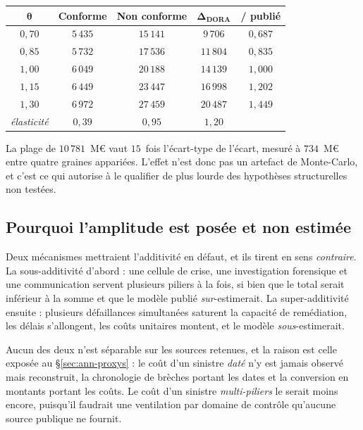 \begin{center}\footnotesize
\renewcommand{\arraystretch}{1.25}
\begin{tabular}{@{}c c c c c@{}}
\toprule
$\boldsymbol{\theta}$ & \textbf{Conforme} & \textbf{Non conforme} &
$\boldsymbol{\Delta_{\text{DORA}}}$ & \textbf{/ publié} \\
\midrule
$0{,}70$ & $5\,435$ & $15\,141$ & $9\,706$ & $0{,}687$ \\
$0{,}85$ & $5\,732$ & $17\,536$ & $11\,804$ & $0{,}835$ \\
$1{,}00$ & $6\,049$ & $20\,188$ & $14\,139$ & $1{,}000$ \\
$1{,}15$ & $6\,449$ & $23\,447$ & $16\,998$ & $1{,}202$ \\
$1{,}30$ & $6\,972$ & $27\,459$ & $20\,487$ & $1{,}449$ \\
\midrule
\emph{élasticité} & $0{,}39$ & $0{,}95$ & $1{,}20$ & \\
\bottomrule
\end{tabular}
\end{center}

\vspace{4pt}
\noindent La plage de $10\,781$~M\euro{} vaut $15$~fois l'écart-type de l'écart, mesuré à
$734$~M\euro{} entre quatre graines appariées. L'effet n'est donc pas un artefact de Monte-Carlo,
et c'est ce qui autorise à le qualifier de plus lourde des hypothèses structurelles non testées.

\subsection*{Pourquoi l'amplitude est posée et non estimée}

Deux mécanismes mettraient l'additivité en défaut, et ils tirent en sens \emph{contraire}. La
sous-additivité d'abord : une cellule de crise, une investigation forensique et une communication
servent plusieurs piliers à la fois, si bien que le total serait inférieur à la somme et que le
modèle publié \emph{sur}-estimerait. La super-additivité ensuite : plusieurs défaillances
simultanées saturent la capacité de remédiation, les délais s'allongent, les coûts unitaires
montent, et le modèle \emph{sous}-estimerait.

Aucun des deux n'est séparable sur les sources retenues, et la raison est celle exposée au
\S\ref{sec:ann-proxys} : le coût d'un sinistre \emph{daté} n'y est jamais observé mais reconstruit,
la chronologie de brèches portant les dates et la conversion en montants portant les coûts. Le coût
d'un sinistre \emph{multi-piliers} le serait moins encore, puisqu'il faudrait une ventilation par
domaine de contrôle qu'aucune source publique ne fournit.

